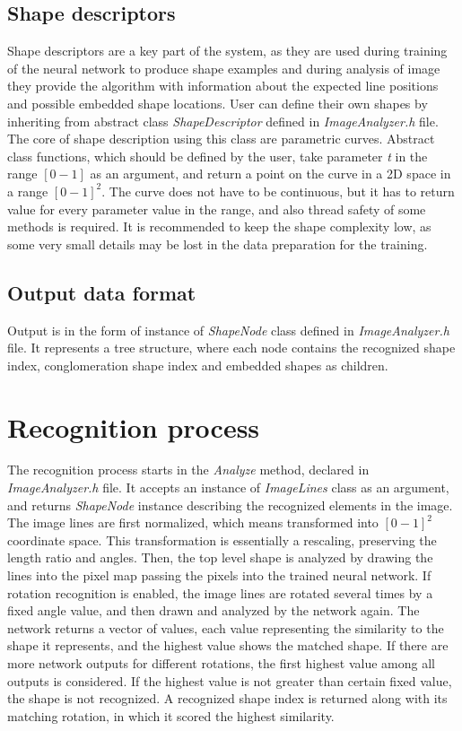 \begin{description}
\subsection{Shape descriptors}
Shape descriptors are a key part of the system, as they are used during training of the neural network to produce shape examples and during analysis of image they provide the algorithm with information about the expected line positions and possible embedded shape locations. User can define their own shapes by inheriting from abstract class \emph{ShapeDescriptor} defined in \emph{ImageAnalyzer.h} file. The core of shape description using this class are parametric curves. Abstract class functions, which should be defined by the user, take parameter \emph{t} in the range $[0-1]$ as an argument, and return a point on the curve in a 2D space in a range $[0-1]^2$. The curve does not have to be continuous, but it has to return value for every parameter value in the range, and also thread safety of some methods is required. It is recommended to keep the shape complexity low, as some very small details may be lost in the data preparation for the training. 

\subsection{Output data format}
Output is in the form of instance of \emph{ShapeNode} class defined in \emph{ImageAnalyzer.h} file. It represents a tree structure, where each node contains the recognized shape index, conglomeration shape index and embedded shapes as children.

\section{Recognition process}
The recognition process starts in the \emph{Analyze} method, declared in \emph{ImageAnalyzer.h} file. It accepts an instance of \emph{ImageLines} class as an argument, and returns \emph{ShapeNode} instance describing the recognized elements in the image. The image lines are first normalized, which means transformed into $[0-1]^2$ coordinate space. This transformation is essentially a rescaling, preserving the length ratio and angles. Then, the top level shape is analyzed by drawing the lines into the pixel map passing the pixels into the trained neural network. If rotation recognition is enabled, the image lines are rotated several times by a fixed angle value, and then drawn and analyzed by the network again. The network returns a vector of values, each value representing the similarity to the shape it represents, and the highest value shows the matched shape. If there are more network outputs for different rotations, the first highest value among all outputs is considered. If the highest value is not greater than certain fixed value, the shape is not recognized. A recognized shape index is returned along with its matching rotation, in which it scored the highest similarity.


\end{description}
